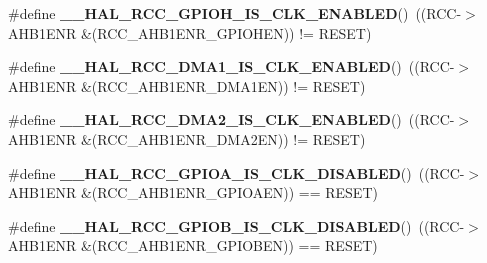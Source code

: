 \begin{DoxyCompactItemize}
\#define {\bfseries \+\_\+\+\_\+\+H\+A\+L\+\_\+\+R\+C\+C\+\_\+\+G\+P\+I\+O\+H\+\_\+\+I\+S\+\_\+\+C\+L\+K\+\_\+\+E\+N\+A\+B\+L\+ED}()~((R\+CC-\/$>$A\+H\+B1\+E\+NR \&(R\+C\+C\+\_\+\+A\+H\+B1\+E\+N\+R\+\_\+\+G\+P\+I\+O\+H\+EN)) != R\+E\+S\+ET)
\item 
\mbox{\label{group___r_c_c___a_h_b1___peripheral___clock___enable___disable___status_gaab05e603c9cadd72e4b6397837b46cef}} 
\#define {\bfseries \+\_\+\+\_\+\+H\+A\+L\+\_\+\+R\+C\+C\+\_\+\+D\+M\+A1\+\_\+\+I\+S\+\_\+\+C\+L\+K\+\_\+\+E\+N\+A\+B\+L\+ED}()~((R\+CC-\/$>$A\+H\+B1\+E\+NR \&(R\+C\+C\+\_\+\+A\+H\+B1\+E\+N\+R\+\_\+\+D\+M\+A1\+EN)) != R\+E\+S\+ET)
\item 
\mbox{\label{group___r_c_c___a_h_b1___peripheral___clock___enable___disable___status_gad0ccdaf669ea327e80c455db4dc36177}} 
\#define {\bfseries \+\_\+\+\_\+\+H\+A\+L\+\_\+\+R\+C\+C\+\_\+\+D\+M\+A2\+\_\+\+I\+S\+\_\+\+C\+L\+K\+\_\+\+E\+N\+A\+B\+L\+ED}()~((R\+CC-\/$>$A\+H\+B1\+E\+NR \&(R\+C\+C\+\_\+\+A\+H\+B1\+E\+N\+R\+\_\+\+D\+M\+A2\+EN)) != R\+E\+S\+ET)
\item 
\mbox{\label{group___r_c_c___a_h_b1___peripheral___clock___enable___disable___status_ga2d73b007700fe1576c7965ce677148bd}} 
\#define {\bfseries \+\_\+\+\_\+\+H\+A\+L\+\_\+\+R\+C\+C\+\_\+\+G\+P\+I\+O\+A\+\_\+\+I\+S\+\_\+\+C\+L\+K\+\_\+\+D\+I\+S\+A\+B\+L\+ED}()~((R\+CC-\/$>$A\+H\+B1\+E\+NR \&(R\+C\+C\+\_\+\+A\+H\+B1\+E\+N\+R\+\_\+\+G\+P\+I\+O\+A\+EN)) == R\+E\+S\+ET)
\item 
\mbox{\label{group___r_c_c___a_h_b1___peripheral___clock___enable___disable___status_ga9b9353035473ac5f144f6e5385c4bebb}} 
\#define {\bfseries \+\_\+\+\_\+\+H\+A\+L\+\_\+\+R\+C\+C\+\_\+\+G\+P\+I\+O\+B\+\_\+\+I\+S\+\_\+\+C\+L\+K\+\_\+\+D\+I\+S\+A\+B\+L\+ED}()~((R\+CC-\/$>$A\+H\+B1\+E\+NR \&(R\+C\+C\+\_\+\+A\+H\+B1\+E\+N\+R\+\_\+\+G\+P\+I\+O\+B\+EN)) == R\+E\+S\+ET)
\item 
\mbox{\label{group___r_c_c___a_h_b1___peripheral___clock___enable___disable___status_ga5e939d98ecca025c028bd1d837b84c81}} 

\end{DoxyCompactItemize}
